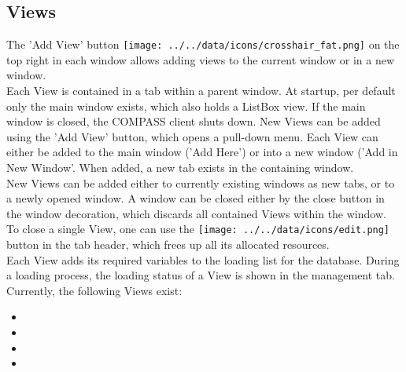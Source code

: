 




%

% 
% 

% 

\subsection{Views}
The 'Add View' button \texttt{[image: ../../data/icons/crosshair\_fat.png]} on the top right in each window allows adding views to the current window or in a new window. \\

Each View is contained in a tab within a parent window.  At startup, per default only the main window exists, which also holds
a ListBox view. If the main window is closed, the COMPASS client shuts down. New Views can be added using the 'Add View' button, which opens a pull-down menu. Each View can either be added to the main window ('Add Here') or into a new window ('Add in New Window'. When added, a new tab exists in the containing window. \\

New Views can be added either to currently existing windows as new tabs, or to a newly opened window. A window can be closed either by the close button in the window decoration, which discards all contained Views within the window.  \\

To close a single View, one can use the \texttt{[image: ../../data/icons/edit.png]} button in the tab header, which frees up all its allocated resources. \\

Each View adds its required variables to the loading list for the database. During a loading process, the loading status  of a View is shown in the management tab.\\

Currently, the following Views exist:
\begin{itemize}
 \item {}
 \item {}
 \item {}
 \item {}
\end{itemize}

